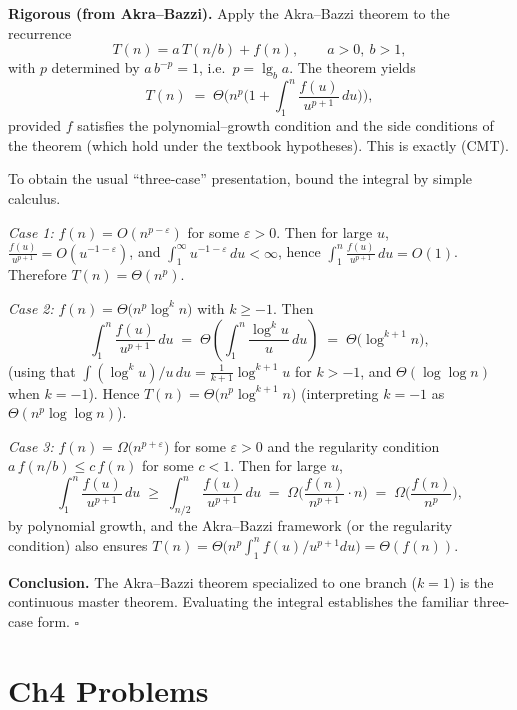 \documentclass[12pt]{article}
\theoremstyle{definition}
\begin{document}
\medskip
\noindent\textbf{Rigorous (from Akra–Bazzi).}
Apply the Akra–Bazzi theorem to the recurrence
\[
T(n)=a\,T(n/b)+f(n),\qquad a>0,\ b>1,
\]
with $p$ determined by $a\,b^{-p}=1$, i.e.\ $p=\lg_b a$.
The theorem yields
\[
T(n)\;=\;\Theta\!\Big(n^{p}\Big(1+\int_{1}^{n}\frac{f(u)}{u^{p+1}}\,du\Big)\Big),
\]
provided $f$ satisfies the polynomial–growth condition and the side conditions of the
theorem (which hold under the textbook hypotheses).  This is exactly (CMT).

\smallskip
To obtain the usual “three-case” presentation, bound the integral by simple calculus.

\medskip
\emph{Case 1:} $f(n)=O(n^{p-\varepsilon})$ for some $\varepsilon>0$.
Then for large $u$, $\frac{f(u)}{u^{p+1}}=O(u^{-1-\varepsilon})$, and
$\int_{1}^{\infty} u^{-1-\varepsilon}\,du<\infty$, hence
$\int_{1}^{n} \frac{f(u)}{u^{p+1}}\,du = O(1)$.
Therefore $T(n)=\Theta(n^{p})$.

\medskip
\emph{Case 2:} $f(n)=\Theta\!\big(n^{p}\log^{k} n\big)$ with $k\ge -1$.
Then
\[
\int_{1}^{n}\frac{f(u)}{u^{p+1}}\,du
\;=\;\Theta\!\left(\int_{1}^{n}\frac{\log^{k} u}{u}\,du\right)
\;=\;\Theta\!\big(\log^{k+1} n\big),
\]
(using that $\int (\log^{k}u)/u\,du=\frac{1}{k+1}\log^{k+1}u$ for $k>-1$, and $\Theta(\log\log n)$
when $k=-1$). Hence $T(n)=\Theta\!\big(n^{p}\log^{k+1} n\big)$ (interpreting $k=-1$ as $\Theta(n^{p}\log\log n)$).

\medskip
\emph{Case 3:} $f(n)=\Omega\!\big(n^{p+\varepsilon}\big)$ for some $\varepsilon>0$ and the regularity condition
$a\,f(n/b)\le c\,f(n)$ for some $c<1$.
Then for large $u$,
\[
\int_{1}^{n}\frac{f(u)}{u^{p+1}}\,du
\;\ge\; \int_{n/2}^{n}\frac{f(u)}{u^{p+1}}\,du
\;=\;\Omega\!\Big(\frac{f(n)}{n^{p+1}}\cdot n\Big)
\;=\;\Omega\!\Big(\frac{f(n)}{n^{p}}\Big),
\]
by polynomial growth, and the Akra–Bazzi framework (or the regularity condition) also
ensures $T(n)=\Theta\!\big(n^{p}\int_1^n f(u)/u^{p+1}du\big)=\Theta(f(n))$.

\medskip
\noindent\textbf{Conclusion.}
The Akra–Bazzi theorem specialized to one branch ($k=1$) is the continuous master theorem.
Evaluating the integral establishes the familiar three-case form.
\hfill$\square$

\newpage

\dotfill
\section*{Ch4 Problems}
\dotfill

\newpage
\end{document}
